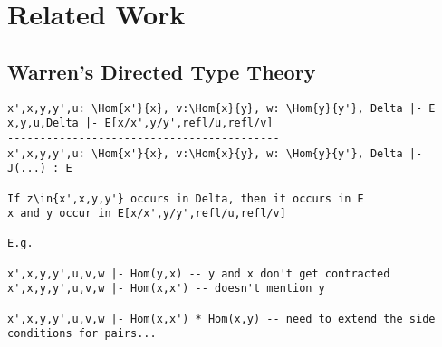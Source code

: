 \documentclass[11pt]{article}
\theoremstyle{plain}
\begin{document}





\section{Related Work}

\subsection{Warren's Directed Type Theory}

\begin{verbatim}
x',x,y,y',u: \Hom{x'}{x}, v:\Hom{x}{y}, w: \Hom{y}{y'}, Delta |- E
x,y,u,Delta |- E[x/x',y/y',refl/u,refl/v]
------------------------------------------
x',x,y,y',u: \Hom{x'}{x}, v:\Hom{x}{y}, w: \Hom{y}{y'}, Delta |- J(...) : E

If z\in{x',x,y,y'} occurs in Delta, then it occurs in E
x and y occur in E[x/x',y/y',refl/u,refl/v]

E.g. 

x',x,y,y',u,v,w |- Hom(y,x) -- y and x don't get contracted
x',x,y,y',u,v,w |- Hom(x,x') -- doesn't mention y

x',x,y,y',u,v,w |- Hom(x,x') * Hom(x,y) -- need to extend the side conditions for pairs...
\end{verbatim}


{ %


}
\end{document}
